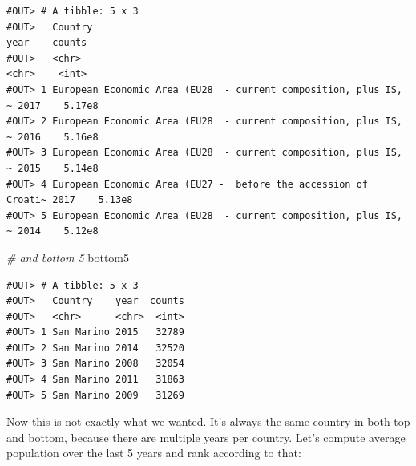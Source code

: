 \documentclass[]{book}
\newenvironment{Shaded}{\begin{snugshade}}{\end{snugshade}}
\newcommand{\KeywordTok}[1]{\textcolor[rgb]{0.13,0.29,0.53}{\textbf{#1}}}
\newcommand{\DataTypeTok}[1]{\textcolor[rgb]{0.13,0.29,0.53}{#1}}
\newcommand{\DecValTok}[1]{\textcolor[rgb]{0.00,0.00,0.81}{#1}}
\newcommand{\StringTok}[1]{\textcolor[rgb]{0.31,0.60,0.02}{#1}}
\newcommand{\CommentTok}[1]{\textcolor[rgb]{0.56,0.35,0.01}{\textit{#1}}}
\newcommand{\OperatorTok}[1]{\textcolor[rgb]{0.81,0.36,0.00}{\textbf{#1}}}
\newcommand{\NormalTok}[1]{#1}
\begin{document}
\begin{verbatim}
#OUT> # A tibble: 5 x 3
#OUT>   Country                                                         year    counts
#OUT>   <chr>                                                           <chr>    <int>
#OUT> 1 European Economic Area (EU28  - current composition, plus IS, ~ 2017    5.17e8
#OUT> 2 European Economic Area (EU28  - current composition, plus IS, ~ 2016    5.16e8
#OUT> 3 European Economic Area (EU28  - current composition, plus IS, ~ 2015    5.14e8
#OUT> 4 European Economic Area (EU27 -  before the accession of Croati~ 2017    5.13e8
#OUT> 5 European Economic Area (EU28  - current composition, plus IS, ~ 2014    5.12e8
\end{verbatim}

\begin{Shaded}
\begin{Highlighting}[]
\CommentTok{# and bottom 5}
\NormalTok{bottom5}
\end{Highlighting}
\end{Shaded}

\begin{verbatim}
#OUT> # A tibble: 5 x 3
#OUT>   Country    year  counts
#OUT>   <chr>      <chr>  <int>
#OUT> 1 San Marino 2015   32789
#OUT> 2 San Marino 2014   32520
#OUT> 3 San Marino 2008   32054
#OUT> 4 San Marino 2011   31863
#OUT> 5 San Marino 2009   31269
\end{verbatim}

Now this is not exactly what we wanted. It's always the same country in
both top and bottom, because there are multiple years per country. Let's
compute average population over the last 5 years and rank according to
that:

\begin{Shaded}
\end{Shaded}
\end{document}
